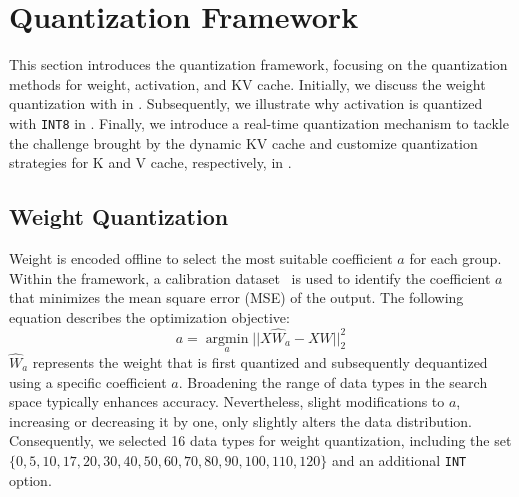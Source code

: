 \section{\proj Quantization Framework}
\label{sec:dse}


This section introduces the \proj quantization framework, focusing on the quantization methods for weight, activation, and KV cache.
Initially, we discuss the weight quantization with \mbox{\proj} in \mbox{}.
Subsequently, we illustrate why activation is quantized with \texttt{INT8} in .
Finally, we introduce a real-time \proj quantization mechanism to tackle the challenge brought by the dynamic KV cache and customize quantization strategies for K and V cache, respectively, in .


\subsection{Weight Quantization}
\label{sec:weight_quant}

Weight is encoded offline to select the most suitable coefficient $a$ for each group.
Within the \proj framework, a calibration dataset~\cite{gao2020pile} is used to identify the coefficient $a$ that minimizes the mean square error (MSE) of the output.
The following equation describes the optimization objective:
\begin{equation}	
    a = \mathop{argmin}\limits_{a} ||X \hat{W}_{a} - X W||^2_{2}
    \label{eqn:min_mse}
\end{equation}
$\hat{W}_{a}$ represents the weight that is first quantized and subsequently dequantized using a specific coefficient $a$.
Broadening the range of data types in the search space typically enhances accuracy.
Nevertheless, slight modifications to $a$, increasing or decreasing it by one, only slightly alters the data distribution.
Consequently, we selected 16 data types for weight quantization, including the set $\{0, 5, 10, 17, 20, 30, 40, 50, 60, 70, 80, 90, 100, 110, 120\}$ and an additional \texttt{INT} option.


